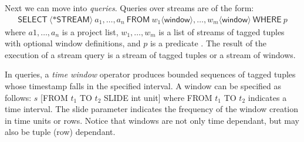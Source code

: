 Next we can move into \emph{queries}. Queries over streams are of the form:
\begin{align*}
\mathsf{SELECT}\ \langle\mathsf{*STREAM}\rangle\ a_1,\ldots ,a_n\ \mathsf{FROM}\ w_1 \langle \mathsf{window} \rangle,\ldots,w_m \langle \mathsf{window} \rangle\ \mathsf{WHERE}\ p
\end{align*}
where $a1, \ldots ,a_n$ is a project list, $w_1, \ldots , w_m$ is a list of streams of tagged tuples with optional
window definitions, and $p$ is a predicate \cite{Arasu_2006,Brenninkmeijer_08}. The result of the execution of a stream
query is a stream of tagged tuples or a stream of windows.

In queries, a \emph{time window} operator produces bounded sequences of tagged tuples whose timestamp falls in the
specified interval. A window can be specified as follows: $s$ \textsf{[FROM} $t_1$ \textsf{TO} $t_2$ \textsf{SLIDE int
unit]} where \textsf{FROM} $t_1$ \textsf{TO} $t_2$ indicates a time interval. The slide parameter indicates the
frequency of the window creation in time units or rows.
Notice that windows are not only time dependant, but may also be tuple (row) dependant.

